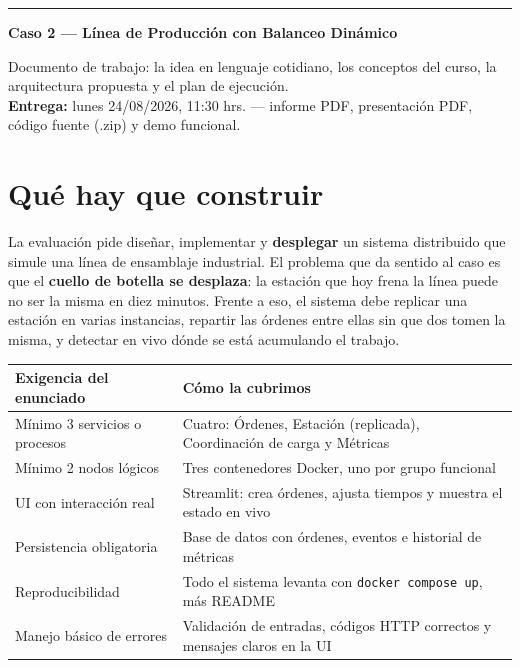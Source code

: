 \documentclass[11pt,a4paper]{article}
\begin{document}
{\color{usachteal}\rule{\textwidth}{1.2pt}}\vspace{-4pt}

{\large\bfseries\color{usachdark} Caso 2 --- Línea de Producción con Balanceo Dinámico}

{\small\color{usachdark!75} Documento de trabajo: la idea en lenguaje cotidiano, los conceptos del curso, la arquitectura propuesta y el plan de ejecución.\\
\textbf{Entrega:} lunes 24/08/2026, 11:30 hrs. --- informe PDF, presentación PDF, código fuente (.zip) y demo funcional.}

\vspace{-2pt}{\color{usachteal}\rule{\textwidth}{0.6pt}}

\section{Qué hay que construir}

La evaluación pide diseñar, implementar y \textbf{desplegar} un sistema distribuido que simule una línea de ensamblaje industrial. El problema que da sentido al caso es que el \textbf{cuello de botella se desplaza}: la estación que hoy frena la línea puede no ser la misma en diez minutos. Frente a eso, el sistema debe replicar una estación en varias instancias, repartir las órdenes entre ellas sin que dos tomen la misma, y detectar en vivo dónde se está acumulando el trabajo.

\vspace{-3pt}
\begin{table}[H]
\centering\footnotesize
\begin{tabular}{@{}L{5.1cm} L{10.1cm}@{}}
\toprule
\textbf{Exigencia del enunciado} & \textbf{Cómo la cubrimos} \\
\midrule
Mínimo 3 servicios o procesos & Cuatro: Órdenes, Estación (replicada), Coordinación de carga y Métricas \\
Mínimo 2 nodos lógicos & Tres contenedores Docker, uno por grupo funcional \\
UI con interacción real & Streamlit: crea órdenes, ajusta tiempos y muestra el estado en vivo \\
Persistencia obligatoria & Base de datos con órdenes, eventos e historial de métricas \\
Reproducibilidad & Todo el sistema levanta con \texttt{docker compose up}, más README \\
Manejo básico de errores & Validación de entradas, códigos HTTP correctos y mensajes claros en la UI \\
\bottomrule
\end{tabular}
\end{table}
\end{document}
